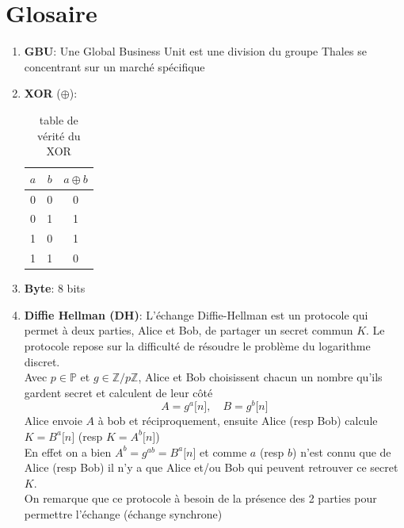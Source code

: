 \documentclass[a4paper, 12pt]{article}
\begin{document}
\section*{Glosaire}
\begin{enumerate}
	\item \textbf{GBU}\label{GBU}: Une Global Business Unit est une division du groupe Thales se concentrant sur un marché spécifique
	\item \textbf{XOR}\label{XOR} ($\oplus$):\\
		
		\begin{table}[h]
		\center
		\begin{tabular}{|c|c|c|}
		\hline
			$a$ & $b$ & $a\oplus b$ \\ \hline\hline
			0 & 0 & 0 \\ \hline
			0 & 1 & 1 \\ \hline
			1 & 0 & 1 \\ \hline
			1 & 1 & 0 \\ \hline
		\end{tabular}
		\caption{table de vérité du XOR}
		\label{XOR_table}
		\end{table}

	\item \textbf{Byte}\label{byte}: 8 bits	
	\item \textbf{Diffie Hellman (DH)}\label{DH}: L'échange Diffie-Hellman est un protocole qui permet à deux parties, Alice et Bob, de partager un secret commun $K$. Le protocole repose sur la difficulté de résoudre le problème du logarithme discret. \\

\noindent Avec $p \in \mathbb{P}$ et $g\in \mathbb{Z}/p\mathbb{Z}$, Alice et Bob choisissent chacun un nombre qu'ils gardent secret et calculent de leur côté 
$$
A = g^a \lbrack n \rbrack, \quad B = g^b \lbrack n \rbrack 
$$
Alice envoie $A$ à bob et réciproquement, ensuite Alice (resp Bob) calcule $K = B^a \lbrack n \rbrack$ (resp $K = A^b \lbrack n \rbrack$) \\

\noindent En effet on a bien $A^b = g^{ab} = B^a \lbrack n \rbrack$ et comme $a$ (resp $b$) n'est connu que de Alice (resp Bob) il n'y a que Alice et/ou Bob qui peuvent retrouver ce secret $K$.\\

\noindent On remarque que ce protocole à besoin de la présence des 2 parties pour permettre l'échange (échange synchrone)
	

\end{enumerate}
\end{document}
